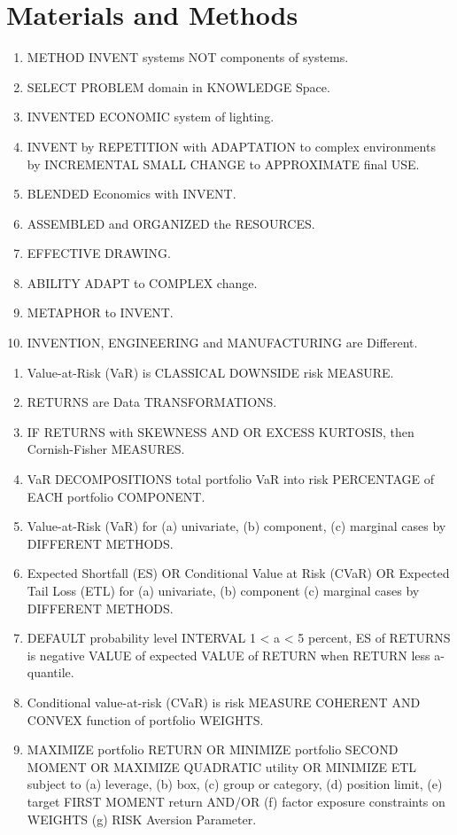 \section{Materials and Methods}
\begin{enumerate}
	\item METHOD INVENT systems NOT components of systems. \cite{key1000}
	\item SELECT PROBLEM domain in KNOWLEDGE Space.\cite{key1000}
	\item INVENTED ECONOMIC system of lighting. \cite{key1000}
	\item INVENT by REPETITION with ADAPTATION to complex environments by INCREMENTAL SMALL CHANGE to APPROXIMATE final USE.\cite{key1000}
	\item BLENDED Economics with INVENT. \cite{key1000}
	\item ASSEMBLED and ORGANIZED the RESOURCES. \cite{key1000}
	\item EFFECTIVE DRAWING. \cite{key1000}
	\item ABILITY ADAPT to COMPLEX change. \cite{key1000}
	\item METAPHOR to INVENT. \cite{key1000}
	\item INVENTION, ENGINEERING and MANUFACTURING are Different. \cite{key1000}
\end{enumerate}
\begin{enumerate}
	\item Value-at-Risk (VaR) is CLASSICAL DOWNSIDE risk MEASURE.\cite{key100}
	\item RETURNS are Data TRANSFORMATIONS. \cite{key100}
	\item IF RETURNS with SKEWNESS AND OR EXCESS KURTOSIS, then Cornish-Fisher MEASURES. \cite{key100}
	\item VaR DECOMPOSITIONS total portfolio VaR into risk PERCENTAGE of EACH portfolio COMPONENT. \cite{key100}
	\item Value-at-Risk (VaR) for (a) univariate, (b) component, (c) marginal cases by DIFFERENT METHODS. \cite{key100}
	\item Expected Shortfall (ES) OR Conditional Value at Risk (CVaR) OR Expected Tail Loss (ETL) for (a) univariate, (b) component (c) marginal cases by DIFFERENT METHODS. \cite{key100}
	\item DEFAULT probability level INTERVAL 1 < a < 5 percent, ES of RETURNS is negative VALUE of expected VALUE of RETURN when RETURN less a-quantile.  \cite{key100}
	\item Conditional value-at-risk (CVaR) is risk MEASURE COHERENT AND CONVEX function of portfolio WEIGHTS. \cite{key100}
	\item MAXIMIZE portfolio RETURN OR MINIMIZE portfolio SECOND MOMENT OR MAXIMIZE QUADRATIC utility OR MINIMIZE ETL subject to (a) leverage, (b) box, (c) group or category, (d) position limit, (e) target FIRST MOMENT return AND/OR (f) factor exposure constraints on WEIGHTS (g) RISK Aversion Parameter.\cite{key100}
\end{enumerate}
